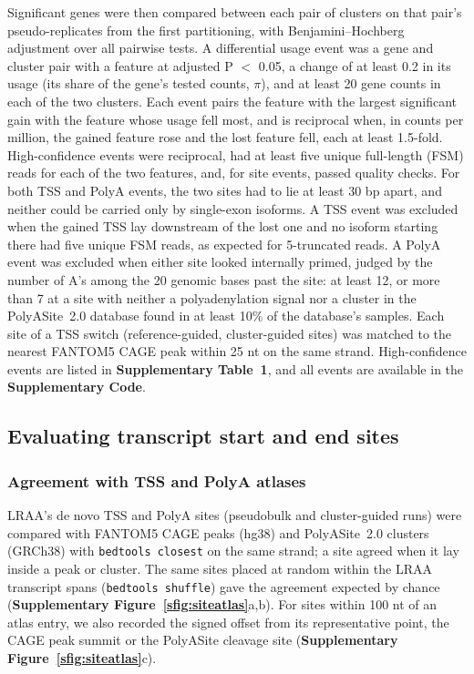 Significant genes were then compared between each pair of clusters on that pair's pseudo-replicates from the first partitioning, with Benjamini--Hochberg adjustment over all pairwise tests. A differential usage event was a gene and cluster pair with a feature at adjusted P $<$ 0.05, a change of at least 0.2 in its usage (its share of the gene's tested counts, \(\pi\)), and at least 20 gene counts in each of the two clusters. Each event pairs the feature with the largest significant gain with the feature whose usage fell most, and is reciprocal when, in counts per million, the gained feature rose and the lost feature fell, each at least 1.5-fold. High-confidence events were reciprocal, had at least five unique full-length (FSM) reads for each of the two features, and, for site events, passed quality checks. For both TSS and PolyA events, the two sites had to lie at least 30 bp apart, and neither could be carried only by single-exon isoforms. A TSS event was excluded when the gained TSS lay downstream of the lost one and no isoform starting there had five unique FSM reads, as expected for 5\p{}-truncated reads. A PolyA event was excluded when either site looked internally primed, judged by the number of A's among the 20 genomic bases past the site: at least 12, or more than 7 at a site with neither a polyadenylation signal nor a cluster in the PolyASite~2.0 database found in at least 10\% of the database's samples. Each site of a TSS switch (reference-guided, cluster-guided sites) was matched to the nearest FANTOM5 CAGE peak \citep{forrest2014} within 25 nt on the same strand. High-confidence events are listed in \textbf{Supplementary Table~1}, and all events are available in the \textbf{Supplementary Code}.

\subsection{Evaluating transcript start and end sites}\label{evaluating-transcript-start-and-end-sites}

\subsubsection{Agreement with TSS and PolyA atlases}\label{agreement-with-tss-and-polya-atlases}

LRAA's de novo TSS and PolyA sites (pseudobulk and cluster-guided runs) were compared with FANTOM5 CAGE peaks (hg38) \citep{forrest2014} and PolyASite~2.0 clusters (GRCh38) \citep{herrmann2020} with \texttt{bedtools closest} \citep{quinlan2010} on the same strand; a site agreed when it lay inside a peak or cluster. The same sites placed at random within the LRAA transcript spans (\texttt{bedtools shuffle}) gave the agreement expected by chance (\textbf{Supplementary Figure~\ref{sfig:siteatlas}}a,b). For sites within 100 nt of an atlas entry, we also recorded the signed offset from its representative point, the CAGE peak summit or the PolyASite cleavage site (\textbf{Supplementary Figure~\ref{sfig:siteatlas}}c).

